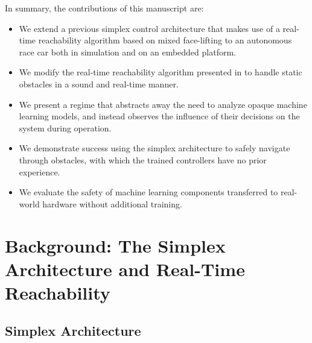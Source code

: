 \documentclass[manuscript,screen,review]{acmart}
\begin{document}
In summary, the contributions of this manuscript are: \raggedbottom
\begin{itemize}%
    \item We extend a previous simplex control architecture that makes use of a real-time reachability algorithm based on mixed face-lifting to an autonomous race car both in simulation and on an embedded platform.
    \item We modify the real-time reachability algorithm presented in \cite{Bak2014} to handle static obstacles in a sound and real-time manner.
    \item We present a regime that abstracts away the need to analyze opaque machine learning models, and instead observes the influence of their decisions on the system during operation.
    \item We demonstrate success using the simplex architecture to safely navigate through obstacles, with which the trained controllers have no prior experience.
    \item We evaluate the safety of machine learning components transferred to real-world hardware without additional training.
    
\end{itemize}%



\section{Background: The Simplex Architecture and Real-Time Reachability}
\subsection{Simplex Architecture}

\end{document}
